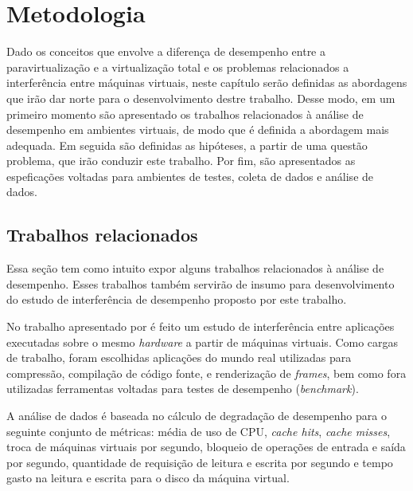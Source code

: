 \chapter{Metodologia}
Dado os conceitos que envolve a diferença de desempenho entre a paravirtualização e a virtualização total e os problemas relacionados a interferência entre máquinas virtuais, neste capítulo serão definidas as abordagens que irão dar norte para o desenvolvimento destre trabalho. Desse modo, em um primeiro momento são apresentado os trabalhos relacionados à análise de desempenho em ambientes virtuais, de modo que é definida a abordagem mais adequada. Em seguida são definidas as hipóteses, a partir de uma questão problema, que irão conduzir este trabalho. Por fim, são apresentados as espeficações voltadas para ambientes de testes, coleta de dados e análise de dados.
\section{Trabalhos relacionados}
Essa seção tem como intuito expor alguns trabalhos relacionados à análise de desempenho. Esses trabalhos também servirão de insumo para desenvolvimento do estudo de interferência de desempenho proposto por este trabalho.

No trabalho apresentado por \cite{koh2007} é feito um estudo de interferência entre aplicações executadas sobre o mesmo \textit{hardware} a partir de máquinas virtuais. Como cargas de trabalho, foram escolhidas aplicações do mundo real utilizadas para compressão, compilação de código fonte, e renderização de \textit{frames}, bem como fora utilizadas ferramentas voltadas para testes de desempenho (\textit{benchmark}).


A análise de dados é baseada no cálculo de degradação de desempenho para o seguinte conjunto de métricas: média de uso de CPU, \textit{cache hits}, \textit{cache misses}, troca de máquinas virtuais por segundo, bloqueio de operações de entrada e saída por segundo, quantidade de requisição de leitura e escrita por segundo e tempo gasto na leitura e escrita para o disco da máquina virtual. 


